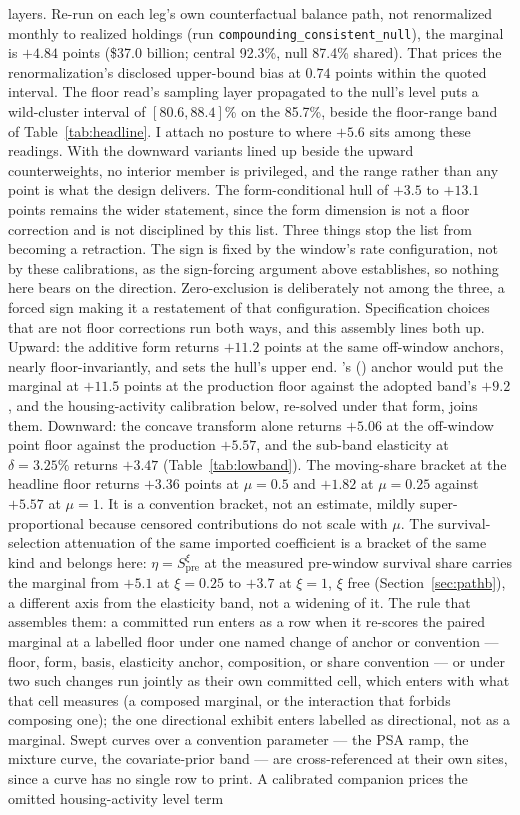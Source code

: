 \documentclass[12pt]{article}
\newcommand{\citepos}[1]{\citeauthor{#1}'s (\citeyear{#1})}
\begin{document}
layers. Re-run on each leg's own counterfactual balance path, not renormalized monthly to realized holdings (run \texttt{compounding\_consistent\_null}), the marginal is $+4.84$ points (\$37.0 billion; central 92.3\%, null 87.4\% shared). That prices the renormalization's disclosed upper-bound bias at $0.74$ points within the quoted interval. The floor read's sampling layer propagated to the null's level puts a wild-cluster interval of $[80.6, 88.4]$\% on the 85.7\%, beside the floor-range band of Table~\ref{tab:headline}. I attach no posture to where $+5.6$ sits among these readings. With the downward variants lined up beside the upward counterweights, no interior member is privileged, and the range rather than any point is what the design delivers. The form-conditional hull of $+3.5$ to $+13.1$ points remains the wider statement, since the form dimension is not a floor correction and is not disciplined by this list. Three things stop the list from becoming a retraction. The sign is fixed by the window's rate configuration, not by these calibrations, as the sign-forcing argument above establishes, so nothing here bears on the direction. Zero-exclusion is deliberately not among the three, a forced sign making it a restatement of that configuration. Specification choices that are not floor corrections run both ways, and this assembly lines both up. Upward: the additive form returns $+11.2$ points at the same off-window anchors, nearly floor-invariantly, and sets the hull's upper end. \citepos{fonseca2024} anchor would put the marginal at $+11.5$ points at the production floor against the adopted band's $+9.2$, and the housing-activity calibration below, re-solved under that form, joins them. Downward: the concave transform alone returns $+5.06$ at the off-window point floor against the production $+5.57$, and the sub-band elasticity at $\delta = 3.25\%$ returns $+3.47$ (Table~\ref{tab:lowband}). The moving-share bracket at the headline floor returns $+3.36$ points at $\mu = 0.5$ and $+1.82$ at $\mu = 0.25$ against $+5.57$ at $\mu = 1$. It is a convention bracket, not an estimate, mildly super-proportional because censored contributions do not scale with $\mu$. The survival-selection attenuation of the same imported coefficient is a bracket of the same kind and belongs here: $\eta = S_{\mathrm{pre}}^{\xi}$ at the measured pre-window survival share carries the marginal from $+5.1$ at $\xi = 0.25$ to $+3.7$ at $\xi = 1$, $\xi$ free (Section~\ref{sec:pathb}), a different axis from the elasticity band, not a widening of it. The rule that assembles them: a committed run enters as a row when it re-scores the paired marginal at a labelled floor under one named change of anchor or convention --- floor, form, basis, elasticity anchor, composition, or share convention --- or under two such changes run jointly as their own committed cell, which enters with what that cell measures (a composed marginal, or the interaction that forbids composing one); the one directional exhibit enters labelled as directional, not as a marginal. Swept curves over a convention parameter --- the PSA ramp, the mixture curve, the covariate-prior band --- are cross-referenced at their own sites, since a curve has no single row to print. A calibrated companion prices the omitted housing-activity level term 
\end{document}
